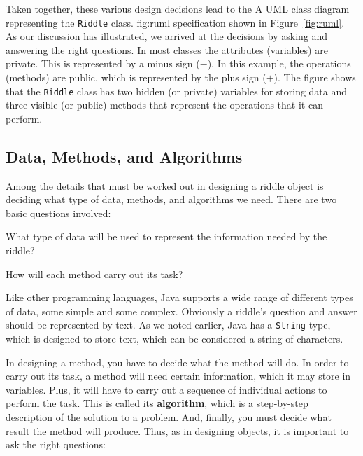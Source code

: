 


\pagebreak
Taken together, these various design decisions lead to the
%
{A UML class diagram representing the  {\tt Riddle} class.}
{fig:ruml}
specification shown in Figure~\ref{fig:ruml}. As our discussion has illustrated,
we arrived at the decisions by asking and answering the right
questions. In most classes the attributes (variables) are
private. This is represented by a minus sign ($-$). In this example,
the operations (methods) are public, which is represented by the plus
sign ($+$). The figure shows that the {\tt Riddle} class has two
hidden (or private) variables for storing data and three visible (or
public) methods that represent the operations that it can perform.

\subsection{Data, Methods, and Algorithms}

\noindent Among the details that must be worked out in
designing a riddle object is deciding what type of data, methods, and
algorithms we need.  There are two basic questions involved:

\begin{BL}
\item  What type of data will be used to represent the information
needed by the riddle?
\item  How will each method carry out its task?
\end{BL}

\noindent Like other programming languages, Java supports a
wide range of different types of data, some simple and some complex.
Obviously a riddle's question and answer should be represented by
text.  As we noted earlier, Java has a {\tt String} type, which is
designed to store text, which can be considered a string of
characters.

In designing a method, you have to decide what the method will do.  
In order to carry out its task, a method will need certain information,
which it may store in variables.  Plus, it will have to carry out a
sequence of individual actions to perform the task. This is called its
{\bf algorithm}, which is a step-by-step description of the solution
to a problem.  And, finally, you must decide what result the method
will produce.  Thus, as in designing objects, it is important to ask
the right questions:

